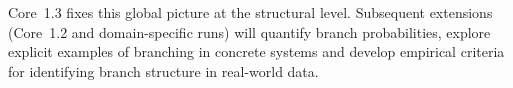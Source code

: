 Core~1.3 fixes this global picture at the structural level. Subsequent
extensions (Core~1.2 and domain-specific runs) will quantify branch
probabilities, explore explicit examples of branching in concrete systems and
develop empirical criteria for identifying branch structure in real-world
data.

